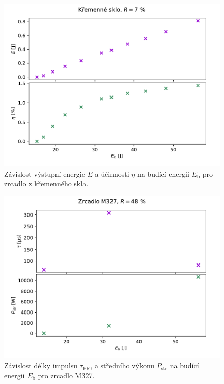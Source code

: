 \begin{figure}[H] 
	\centering
	\includegraphics[scale = 0.7]{img/zrcadlo_kremenne_sklo.pdf} 
	\caption{Závislost výstupní energie $E$ a účinnosti $\eta$ na budící energii $E_\mathrm{b}$ pro zrcadlo z křemenného skla.} 
	\label{fig:ucinnost_kremenne_sklo}
\end{figure}

\begin{figure}[H] 
	\centering
	\includegraphics[scale = 0.7]{img/optimalni_zrcadlo.pdf} 
	\caption{Závislost délky impulsu $\tau_\mathrm{FR}$, a středního výkonu $P_\mathrm{str}$ na budící energii $E_\mathrm{b}$ pro zrcadlo M327.} 
	\label{fig:ucinnost_kremenne_sklo}
\end{figure}

			



